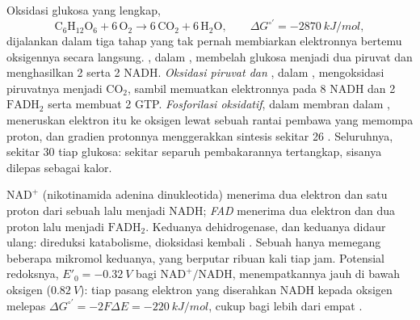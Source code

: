 \begin{proposition}\label{prop:b1:respiration-fermentation:overview}
Oksidasi glukosa yang lengkap,
\[
\mathrm{C_6H_{12}O_6} + 6\,\mathrm{O_2} \to 6\,\mathrm{CO_2} + 6\,\mathrm{H_2O},
\qquad \Delta G^{\circ\prime} = \qty{-2870}{kJ/mol},
\]
dijalankan dalam tiga tahap yang tak pernah membiarkan elektronnya
bertemu oksigennya secara langsung. \emph{}, dalam ,
membelah glukosa menjadi dua piruvat dan menghasilkan 2  serta 2
NADH. \emph{Oksidasi piruvat dan }, dalam , mengoksidasi piruvatnya menjadi $\mathrm{CO_2}$, sambil
memuatkan elektronnya pada 8 NADH dan 2 $\mathrm{FADH_2}$ serta membuat
2 GTP. \emph{Fosforilasi oksidatif}, dalam membran dalam ,
meneruskan elektron itu ke oksigen lewat sebuah rantai pembawa yang
memompa proton, dan gradien protonnya menggerakkan sintesis sekitar 26
. Seluruhnya, sekitar 30  tiap glukosa: sekitar separuh  pembakarannya tertangkap, sisanya dilepas sebagai kalor.
\end{proposition}

\begin{definition}\label{def:b1:respiration-fermentation:carriers}
\emph{$\mathrm{NAD^+}$} (nikotinamida adenina dinukleotida) menerima
dua elektron dan satu proton dari sebuah  lalu menjadi NADH;
\emph{FAD} menerima dua elektron dan dua proton lalu menjadi
$\mathrm{FADH_2}$. Keduanya  dehidrogenase, dan keduanya didaur
ulang: direduksi katabolisme, dioksidasi kembali .
Sebuah  hanya memegang beberapa mikromol keduanya, yang berputar
ribuan kali tiap jam. Potensial redoksnya,
$E'_0 = \qty{-0.32}{V}$ bagi $\mathrm{NAD^+}/\mathrm{NADH}$,
menempatkannya jauh di bawah oksigen ($\qty{+0.82}{V}$): tiap pasang
elektron yang diserahkan NADH kepada oksigen melepas
$\Delta G^{\circ\prime} = -2F\Delta E =
\qty{-220}{kJ/mol}$, cukup bagi lebih dari empat .
\end{definition}

